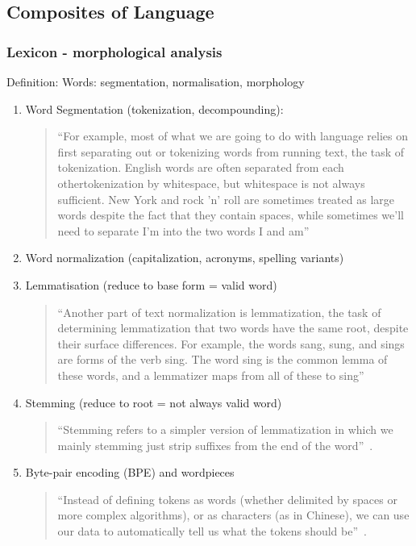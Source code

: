 \documentclass[11pt]{article}
\begin{document}
\subsection{Composites of Language}

\subsubsection{Lexicon - morphological analysis}

Definition: Words: segmentation, normalisation, morphology

\begin{enumerate}
    \item Word Segmentation (tokenization, decompounding): 
    \begin{quote}
        ``For example, most of what we are going to do with language relies on first separating out or tokenizing words from running text, the task of tokenization. English words are often separated from each othertokenization by whitespace, but whitespace is not always sufficient. New York and rock 'n' roll are sometimes treated as large words despite the fact that they contain spaces, while sometimes we'll need to separate I'm into the two words I and am''~\cite{book-speech-and-language-processing}
    \end{quote}
    \item Word normalization (capitalization, acronyms, spelling variants)
    \item Lemmatisation (reduce to base form = valid word)
    \begin{quote}
        ``Another part of text normalization is lemmatization, the task of determining lemmatization that two words have the same root, despite their surface differences. For example, the words sang, sung, and sings are forms of the verb sing. The word sing is the common lemma of these words, and a lemmatizer maps from all of these to sing''~\cite{book-speech-and-language-processing}
    \end{quote}
    \item Stemming (reduce to root = not always valid word)
    \begin{quote}
        ``Stemming refers to a simpler version of lemmatization in which we mainly stemming just strip suffixes from the end of the word''~\cite{book-speech-and-language-processing}.
    \end{quote}
    \item Byte-pair encoding (BPE) and wordpieces
    \begin{quote}
        ``Instead of defining tokens as words (whether delimited by spaces or more complex algorithms), or as characters (as in Chinese), we can use our data to automatically tell us what the tokens should be''~\cite{book-speech-and-language-processing}.
    \end{quote}


\end{enumerate}
\end{document}

